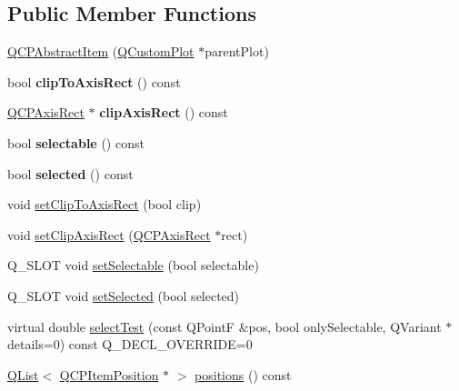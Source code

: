 \subsection*{Public Member Functions}
\begin{DoxyCompactItemize}
\item 
\hyperlink{class_q_c_p_abstract_item_a9922507d8b4503a1fe1ed0b1030e23b6}{Q\+C\+P\+Abstract\+Item} (\hyperlink{class_q_custom_plot}{Q\+Custom\+Plot} $\ast$parent\+Plot)
\item 
\mbox{\label{class_q_c_p_abstract_item_a42715ad5f3d7fca6854025fa5636f436}} 
bool {\bfseries clip\+To\+Axis\+Rect} () const
\item 
\mbox{\label{class_q_c_p_abstract_item_ae162314efd3fe1a6d4df11da1d275d52}} 
\hyperlink{class_q_c_p_axis_rect}{Q\+C\+P\+Axis\+Rect} $\ast$ {\bfseries clip\+Axis\+Rect} () const
\item 
\mbox{\label{class_q_c_p_abstract_item_ae29aa489767352b40c4aaa7ea50c5582}} 
bool {\bfseries selectable} () const
\item 
\mbox{\label{class_q_c_p_abstract_item_aa069fba320a13639f119f82ad29ead96}} 
bool {\bfseries selected} () const
\item 
void \hyperlink{class_q_c_p_abstract_item_a39e05b9d4176b9accafc746d16ca6a06}{set\+Clip\+To\+Axis\+Rect} (bool clip)
\item 
void \hyperlink{class_q_c_p_abstract_item_a7dc75fcbcd10206fe0b75d757ea7a347}{set\+Clip\+Axis\+Rect} (\hyperlink{class_q_c_p_axis_rect}{Q\+C\+P\+Axis\+Rect} $\ast$rect)
\item 
Q\+\_\+\+S\+L\+OT void \hyperlink{class_q_c_p_abstract_item_a8a8e32a55bc478b849756a78c2d87fd2}{set\+Selectable} (bool selectable)
\item 
Q\+\_\+\+S\+L\+OT void \hyperlink{class_q_c_p_abstract_item_a203de94ad586cc44d16c9565f49d3378}{set\+Selected} (bool selected)
\item 
virtual double \hyperlink{class_q_c_p_abstract_item_ae41d0349d68bb802c49104afd100ba2a}{select\+Test} (const Q\+PointF \&pos, bool only\+Selectable, Q\+Variant $\ast$details=0) const Q\+\_\+\+D\+E\+C\+L\+\_\+\+O\+V\+E\+R\+R\+I\+DE=0
\item 
\hyperlink{class_q_list}{Q\+List}$<$ \hyperlink{class_q_c_p_item_position}{Q\+C\+P\+Item\+Position} $\ast$ $>$ \hyperlink{class_q_c_p_abstract_item_a709f655ac3f7f22d452714134662b454}{positions} () const

\end{DoxyCompactItemize}
